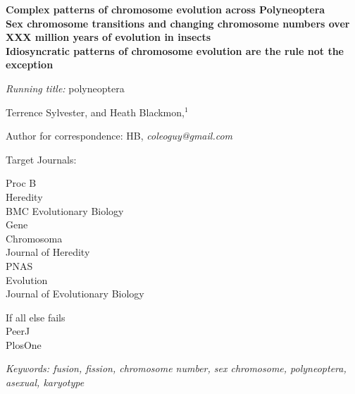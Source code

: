 \documentclass[12pt]{article}
\begin{document}
\linenumbers

\begin{center}
\textbf{Complex patterns of chromosome evolution across Polyneoptera}\\
\vspace{.5cm}
\textbf{Sex chromosome transitions and changing chromosome numbers over XXX million years of evolution in insects}\\
\vspace{.5cm}
\textbf{Idiosyncratic patterns of chromosome evolution are the rule not the exception}
\end{center}

\vfill
\noindent
\textit{Running title:} polyneoptera


\vfill
\noindent
Terrence Sylvester,
%
\noindent
and
Heath Blackmon,$^1$
\vfill


\theendnotes
\noindent
Author for correspondence: HB, \textit{coleoguy@gmail.com}
\vfill

\clearpage

 
\bigskip
\noindent

\noindent 
Target Journals:

\noindent 
Proc B\\
Heredity\\
BMC Evolutionary Biology\\
Gene\\
Chromosoma\\
Journal of Heredity\\
PNAS\\
Evolution\\
Journal of Evolutionary Biology

\noindent 
If all else fails \\
PeerJ\\
PlosOne

\noindent
\textit{Keywords: fusion, fission, chromosome number, sex chromosome, polyneoptera, asexual, karyotype}


\clearpage




\end{document}
